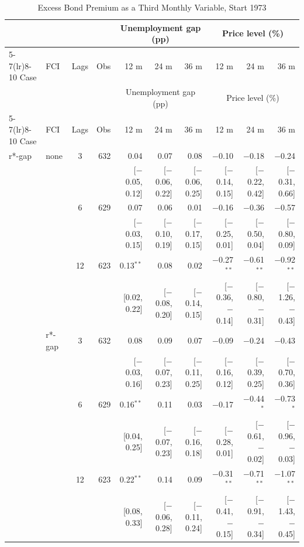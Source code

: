 \begingroup\scriptsize\setlength{\tabcolsep}{0.9pt}
\begin{longtable}{llcrrrrrrr}
\caption{Excess Bond Premium as a Third Monthly Variable, Start 1973}\label{tab:appR3a73}\\
\toprule
 & & & & \multicolumn{3}{c}{Unemployment gap (pp)} & \multicolumn{3}{c}{Price level (\%)}\\ \cmidrule(lr){5-7}\cmidrule(lr){8-10}
Case & FCI & Lags & Obs & 12 m & 24 m & 36 m & 12 m & 24 m & 36 m\\
\midrule\endfirsthead
\toprule
 & & & & \multicolumn{3}{c}{Unemployment gap (pp)} & \multicolumn{3}{c}{Price level (\%)}\\ \cmidrule(lr){5-7}\cmidrule(lr){8-10}
Case & FCI & Lags & Obs & 12 m & 24 m & 36 m & 12 m & 24 m & 36 m\\
\midrule\endhead
\bottomrule\endfoot
r*-gap & none & 3 & 632 & 0.04 & 0.07 & 0.08 & $-$0.10 & $-$0.18 & $-$0.24\\
 & & & & {\scriptsize [$-$0.05, 0.12]} & {\scriptsize [$-$0.06, 0.22]} & {\scriptsize [$-$0.06, 0.25]} & {\scriptsize [$-$0.14, 0.15]} & {\scriptsize [$-$0.22, 0.42]} & {\scriptsize [$-$0.31, 0.66]}\\
 &  & 6 & 629 & 0.07 & 0.06 & 0.01 & $-$0.16 & $-$0.36 & $-$0.57\\
 & & & & {\scriptsize [$-$0.03, 0.15]} & {\scriptsize [$-$0.10, 0.19]} & {\scriptsize [$-$0.17, 0.15]} & {\scriptsize [$-$0.25, 0.01]} & {\scriptsize [$-$0.50, 0.04]} & {\scriptsize [$-$0.80, 0.09]}\\
 &  & 12 & 623 & 0.13$^{**}$ & 0.08 & 0.02 & $-$0.27$^{**}$ & $-$0.61$^{**}$ & $-$0.92$^{**}$\\
 & & & & {\scriptsize [0.02, 0.22]} & {\scriptsize [$-$0.08, 0.20]} & {\scriptsize [$-$0.14, 0.15]} & {\scriptsize [$-$0.36, $-$0.14]} & {\scriptsize [$-$0.80, $-$0.31]} & {\scriptsize [$-$1.26, $-$0.43]}\\
 & r*-gap & 3 & 632 & 0.08 & 0.09 & 0.07 & $-$0.09 & $-$0.24 & $-$0.43\\
 & & & & {\scriptsize [$-$0.03, 0.16]} & {\scriptsize [$-$0.07, 0.23]} & {\scriptsize [$-$0.11, 0.25]} & {\scriptsize [$-$0.16, 0.12]} & {\scriptsize [$-$0.39, 0.25]} & {\scriptsize [$-$0.70, 0.36]}\\
 &  & 6 & 629 & 0.16$^{**}$ & 0.11 & 0.03 & $-$0.17 & $-$0.44$^{*}$ & $-$0.73$^{*}$\\
 & & & & {\scriptsize [0.04, 0.25]} & {\scriptsize [$-$0.07, 0.23]} & {\scriptsize [$-$0.16, 0.18]} & {\scriptsize [$-$0.28, 0.01]} & {\scriptsize [$-$0.61, $-$0.02]} & {\scriptsize [$-$0.96, $-$0.03]}\\
 &  & 12 & 623 & 0.22$^{**}$ & 0.14 & 0.09 & $-$0.31$^{**}$ & $-$0.71$^{**}$ & $-$1.07$^{**}$\\
 & & & & {\scriptsize [0.08, 0.33]} & {\scriptsize [$-$0.06, 0.28]} & {\scriptsize [$-$0.11, 0.24]} & {\scriptsize [$-$0.41, $-$0.15]} & {\scriptsize [$-$0.91, $-$0.34]} & {\scriptsize [$-$1.43, $-$0.45]}\\
\end{longtable}
